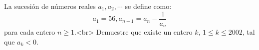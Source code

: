 La sucesión de números reales $a_1, a_2, \cdots$ se define como:
\[ a_1 = 56, a_{n+1} = a_n - \frac{1}{a_n} \]
para cada entero $n \geq 1$.<br>
Demuestre que existe un entero $k$, $1 \leq k \leq 2002$, tal que $a_k < 0$.
